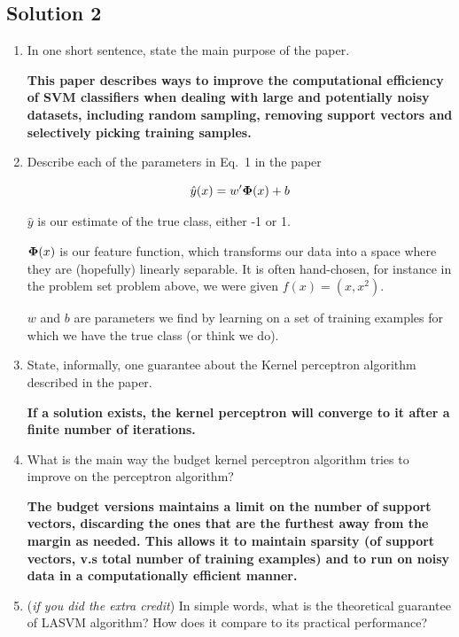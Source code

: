 \documentclass[submit]{harvardml}
\newenvironment{answer}{%
    \color{answergreen}\bf}
  {%
  }
\begin{document}
\subsection*{Solution 2}
\begin{enumerate}
\item In one short sentence, state the main purpose of the paper.

    \begin{answer}
        This paper describes ways to improve the computational efficiency of SVM classifiers when
        dealing with large and potentially noisy datasets, including random sampling, removing
        support vectors and selectively picking training samples.
    \end{answer}
\item Describe each of the parameters in Eq.~1 in the paper

    \begin{answer}
        $$
        \hat{y}(x) = w'\mathbf{\Phi}(x) + b
        $$

        $\hat{y}$ is our estimate of the true class, either -1 or 1.

        $\mathbf{\Phi}(x)$ is our feature function, which transforms our data into a space where they are
        (hopefully) linearly separable. It is often hand-chosen, for instance in the problem set
        problem above, we were given $f(x) = (x, x^2)$.

        $w$ and $b$ are parameters we find by learning on a set of training examples for which we
        have the true class (or think we do).

    \end{answer}

\item State, informally, one guarantee about the Kernel perceptron algorithm described in the
  paper. 

    \begin{answer}
        If a solution exists, the kernel perceptron will converge to it after a finite number of
        iterations.
    \end{answer}

\item What is the main way the budget kernel perceptron algorithm tries to
  improve on the perceptron algorithm?

    \begin{answer}
        The budget versions maintains a limit on the number of support vectors, discarding the ones
        that are the furthest away from the margin as needed. This allows it to maintain sparsity
        (of support vectors, v.s total number of training examples) and to run on noisy data in a
        computationally efficient manner.
    \end{answer}
\item ({\em if you did the extra credit}) In simple words, what is the theoretical guarantee of LASVM algorithm? How does it compare to its practical performance?


\end{enumerate}
\end{document}
